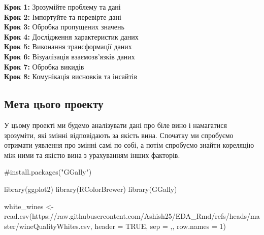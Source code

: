 \documentclass[
  letterpaper,
  DIV=11,
  numbers=noendperiod]{scrreprt}
\newenvironment{Shaded}{\begin{snugshade}}{\end{snugshade}}
\newcommand{\AttributeTok}[1]{\textcolor[rgb]{0.40,0.45,0.13}{#1}}
\newcommand{\CommentTok}[1]{\textcolor[rgb]{0.37,0.37,0.37}{#1}}
\newcommand{\ConstantTok}[1]{\textcolor[rgb]{0.56,0.35,0.01}{#1}}
\newcommand{\DecValTok}[1]{\textcolor[rgb]{0.68,0.00,0.00}{#1}}
\newcommand{\FunctionTok}[1]{\textcolor[rgb]{0.28,0.35,0.67}{#1}}
\newcommand{\NormalTok}[1]{\textcolor[rgb]{0.00,0.23,0.31}{#1}}
\newcommand{\OtherTok}[1]{\textcolor[rgb]{0.00,0.23,0.31}{#1}}
\newcommand{\StringTok}[1]{\textcolor[rgb]{0.13,0.47,0.30}{#1}}
\begin{document}
\textbf{Крок 1:} Зрозумійте проблему та дані\\
\textbf{Крок 2:} Імпортуйте та перевірте дані\\
\textbf{Крок 3:} Обробка пропущених значень\\
\textbf{Крок 4:} Дослідження характеристик даних\\
\textbf{Крок 5:} Виконання трансформації даних\\
\textbf{Крок 6:} Візуалізація взаємозв'язків даних\\
\textbf{Крок 7:} Обробка викидів\\
\textbf{Крок 8:} Комунікація висновків та інсайтів

\subsection{Мета цього
проекту}\label{ux43cux435ux442ux430-ux446ux44cux43eux433ux43e-ux43fux440ux43eux435ux43aux442ux443}

У цьому проекті ми будемо аналізувати дані про біле вино і намагатися
зрозуміти, які змінні відповідають за якість вина. Спочатку ми спробуємо
отримати уявлення про змінні самі по собі, а потім спробуємо знайти
кореляцію між ними та якістю вина з урахуванням інших факторів.

\begin{Shaded}
\begin{Highlighting}[]
\CommentTok{\#install.packages("GGally")}
\end{Highlighting}
\end{Shaded}

\begin{Shaded}
\begin{Highlighting}[]
\FunctionTok{library}\NormalTok{(ggplot2)}
\FunctionTok{library}\NormalTok{(RColorBrewer)}
\FunctionTok{library}\NormalTok{(GGally)}
\end{Highlighting}
\end{Shaded}

\begin{Shaded}
\begin{Highlighting}[]
\NormalTok{white\_wines }\OtherTok{\textless{}{-}} \FunctionTok{read.csv}\NormalTok{(}\StringTok{\textquotesingle{}https://raw.githubusercontent.com/Ashish25/EDA\_Rmd/refs/heads/master/wineQualityWhites.csv\textquotesingle{}}\NormalTok{, }
                        \AttributeTok{header =} \ConstantTok{TRUE}\NormalTok{, }
                        \AttributeTok{sep =} \StringTok{\textquotesingle{},\textquotesingle{}}\NormalTok{, }
                        \AttributeTok{row.names =} \DecValTok{1}\NormalTok{)}
\end{Highlighting}
\end{Shaded}
\end{document}
